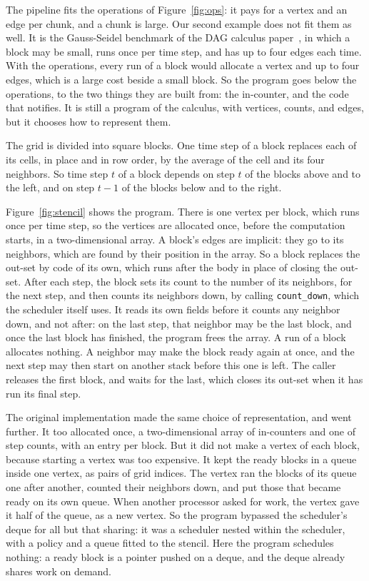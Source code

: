 \documentclass[sigplan,nonacm]{acmart}
\begin{document}
The pipeline fits the operations of Figure~\ref{fig:ops}: it pays
for a vertex and an edge per chunk, and a chunk is large.
%
Our second example does not fit them as well.
%
It is the Gauss-Seidel benchmark of the DAG calculus
paper~\cite{Dag_calculus_16}, in which a block may be small, runs
once per time step, and has up to four edges each time.
%
With the operations, every run of a block would allocate a vertex and
up to four edges, which is a large cost beside a small block.
%
So the program goes below the operations, to the two things they are
built from: the in-counter, and the code that notifies.
%
It is still a program of the calculus, with vertices, counts, and
edges, but it chooses how to represent them.

%
The grid is divided into square blocks.
%
One time step of a block replaces each of its cells, in place and in
row order, by the average of the cell and its four neighbors.
%
So time step $t$ of a block depends on step $t$ of the blocks above and
to the left, and on step $t-1$ of the blocks below and to the right.

Figure~\ref{fig:stencil} shows the program.
%
There is one vertex per block, which runs once per time step, so the
vertices are allocated once, before the computation starts, in a
two-dimensional array.
%
A block's edges are implicit: they go to its neighbors, which are
found by their position in the array.
%
So a block replaces the out-set by code of its own, which runs after
the body in place of closing the out-set.
%
After each step, the block sets its count to the number of its
neighbors, for the next step, and then counts its neighbors down, by
calling \lstinline|count_down|, which the scheduler itself uses.
%
It reads its own fields before it counts any neighbor down, and not
after: on the last step, that neighbor may be the last block, and
once the last block has finished, the program frees the array.
%
A run of a block allocates nothing.
%
A neighbor may make the block ready again at once, and the next step
may then start on another stack before this one is left.
%
The caller releases the first block, and waits for the last, which
closes its out-set when it has run its final step.

The original implementation made the same choice of representation,
and went further.
%
It too allocated once, a two-dimensional array of in-counters and one
of step counts, with an entry per block.
%
But it did not make a vertex of each block, because starting a vertex
was too expensive.
%
It kept the ready blocks in a queue inside one vertex, as pairs of
grid indices.
%
The vertex ran the blocks of its queue one after another, counted
their neighbors down, and put those that became ready on its own
queue.
%
When another processor asked for work, the vertex gave it half of the
queue, as a new vertex.
%
So the program bypassed the scheduler's deque for all but that
sharing: it was a scheduler nested within the scheduler, with a policy
and a queue fitted to the stencil.
%
Here the program schedules nothing: a ready block is a pointer pushed
on a deque, and the deque already shares work on demand.
\end{document}
